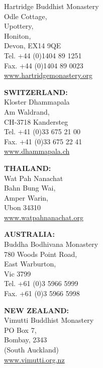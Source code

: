 {\begin{minipage}{0.95\linewidth}
\begin{multicols}{2}
{\vfill

Hartridge Buddhist Monastery\\
Odle Cottage,\\
Upottery,\\
Honiton,\\
Devon, EX14 9QE\\
Tel. +44 (0)1404 89 1251\\
Fax. +44 (0)1404 89 0023\\
\href{http://www.hartridgemonastery.org}{www.hartridgemonastery.org}

}

\columnbreak

{\raggedright

\textbf{SWITZERLAND:} \\
Kloster Dhammapala\\
Am Waldrand,\\
CH-3718 Kandersteg\\
Tel. +41 (0)33 675 21 00\\
Fax. +41 (0)33 675 22 41\\
\href{http://www.dhammapala.ch}{www.dhammapala.ch}

\vfill

\textbf{THAILAND:} \\
Wat Pah Nanachat\\
Bahn Bung Wai,\\
Amper Warin,\\
Ubon 34310\\
\href{http://www.watpahnanachat.org}{www.watpahnanachat.org}

\vfill

\textbf{AUSTRALIA:} \\
Buddha Bodhivana Monastery\\
780 Woods Point Road,\\
East Warburton,\\
Vic 3799\\
Tel. +61 (0)3 5966 5999\\
Fax. +61 (0)3 5966 5998

\vfill

\textbf{NEW ZEALAND:} \\
Vimutti Buddhist Monastery\\
PO Box 7,\\
Bombay, 2343\\
(South Auckland)\\
\href{http://www.vimutti.org.nz}{www.vimutti.org.nz}

\vfill

}
\end{multicols}
\end{minipage}}
